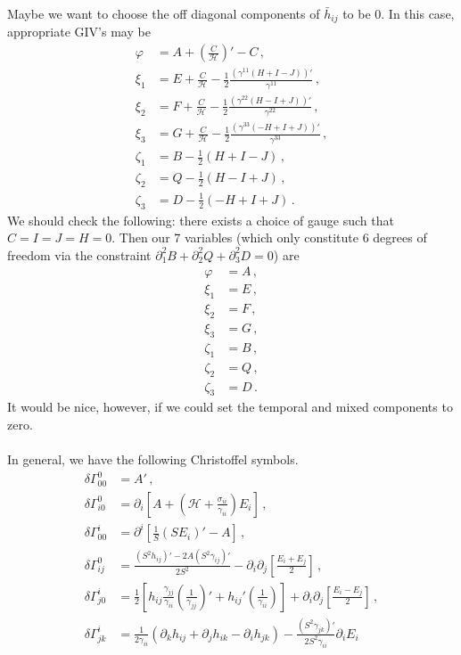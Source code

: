 \documentclass{article}
\newcommand*\scr[1]{\mathscr{#1}}
\newcommand*\p[1]{\left(#1\right)}
\newcommand*\ps[1]{\left[#1\right]}
\newcommand*\f[2]{\frac{#1}{#2}}
\begin{document}
Maybe we want to choose the off diagonal components of $\bar h_{ij}$ to be 0. In this case, appropriate GIV's may be
\begin{align}
\varphi&=A+\p{\f{C}{\scr H}}'-C\,,\\
\xi_1&=E+\f{C}{\scr H}-\f12\f{(\gamma^{11}(H+I-J))'}{\gamma^{11}}\,,\\
\xi_2&=F+\f{C}{\scr H}-\f12\f{(\gamma^{22}(H-I+J))'}{\gamma^{22}}\,,\\
\xi_3&=G+\f{C}{\scr H}-\f12\f{(\gamma^{33}(-H+I+J))'}{\gamma^{33}}\,,\\
\zeta_1&=B-\f12(H+I-J)\,,\\
\zeta_2&=Q-\f12(H-I+J)\,,\\
\zeta_3&=D-\f12(-H+I+J)\,.
\end{align}
We should check the following: there exists a choice of gauge such that $C=I=J=H=0$. Then our 7 variables (which only constitute 6 degrees of freedom via the constraint $\partial_{1}^{2}B+\partial_{2}^{2}Q+\partial_{3}^{2}D=0$) are
\begin{align}
\varphi&=A\,,\\
\xi_1&=E\,,\\
\xi_2&=F\,,\\
\xi_3&=G\,,\\
\zeta_1&=B\,,\\
\zeta_2&=Q\,,\\
\zeta_3&=D\,.
\end{align}
It would be nice, however, if we could set the temporal and mixed components to zero.
\\\\
In general, we have the following Christoffel symbols.
\begin{align}
\delta\Gamma^0_{00}&=A'\,,\\
\delta\Gamma^0_{i0}&=\partial_i\ps{A+\p{\scr H+\f{\sigma_{ii}}{\gamma_{ii}}}E_i}\,,\\
\delta\Gamma^i_{00}&=\partial^i\ps{\f1S\p{SE_i}'-A}\,,\\
\delta\Gamma^0_{ij}&=\f{\p{S^2 h_{ij}}'-2A\p{S^2\gamma_{ij}}'}{2S^2}-\partial_i\partial_j\ps{\f{E_i+E_j}{2}}\,,\\
\delta\Gamma^i_{j0}&=\f12\ps{h_{ij}\f{\gamma_{jj}}{\gamma_{ii}}\p{\f{1}{\gamma_{jj}}}'+h_{ij}'\p{\f{1}{\gamma_{ii}}}}+\partial_i\partial_j\ps{\f{E_i-E_j}{2}}\,,\\
\delta\Gamma^i_{jk}&=\f{1}{2\gamma_{ii}}\p{\partial_k h_{ij}+\partial_j h_{ik}-\partial_i h_{jk}}-\f{(S^2\gamma_{jk})'}{2S^2\gamma_{ii}}\partial_i E_i
\end{align}
\end{document}

